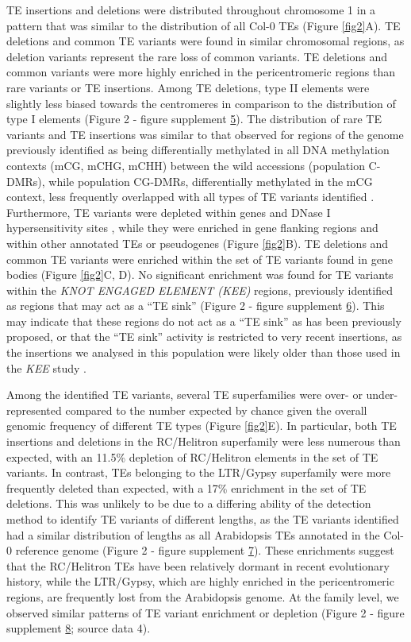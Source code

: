 \documentclass[12pt]{article}
\begin{document}
TE insertions and deletions were distributed throughout chromosome 1
in a pattern that was similar to the distribution of all Col-0 TEs
(Figure \ref{fig2}A). TE deletions and common TE variants were found
in similar chromosomal regions, as deletion variants represent the
rare loss of common variants.  TE deletions and common variants were
more highly enriched in the pericentromeric regions than rare variants
or TE insertions.  Among TE deletions, type II elements were slightly
less biased towards the centromeres in comparison to the distribution
of type I elements (Figure 2 - figure supplement
\hyperref[fig2s5]{5}).  The distribution of rare TE variants and TE
insertions was similar to that observed for regions of the genome
previously identified as being differentially methylated in all DNA
methylation contexts (mCG, mCHG, mCHH) between the wild accessions
(population C-DMRs), while population CG-DMRs, differentially
methylated in the mCG context, less frequently overlapped with all
types of TE variants identified \cite{Schmitz:2013iu}. Furthermore, TE
variants were depleted within genes and DNase I hypersensitivity sites
\cite{Sullivan:2014ii}, while they were enriched in gene flanking
regions and within other annotated TEs or pseudogenes (Figure
\ref{fig2}B). TE deletions and common TE variants were enriched within
the set of TE variants found in gene bodies (Figure \ref{fig2}C,
D). No significant enrichment was found for TE variants within the
\emph{KNOT ENGAGED ELEMENT (KEE) }regions, previously identified as
regions that may act as a ``TE sink'' \cite{Grob:2014kg} (Figure 2 -
figure supplement \hyperref[fig2s6]{6}). This may indicate that these
regions do not act as a ``TE sink'' as has been previously proposed,
or that the ``TE sink'' activity is restricted to very recent
insertions, as the insertions we analysed in this population were
likely older than those used in the \emph{KEE} study
\cite{Grob:2014kg}.

Among the identified TE variants, several TE superfamilies were over-
or under-represented compared to the number expected by chance given
the overall genomic frequency of different TE types (Figure
\ref{fig2}E). In particular, both TE insertions and deletions in the
RC/Helitron superfamily were less numerous than expected, with an
11.5\% depletion of RC/Helitron elements in the set of TE variants. In
contrast, TEs belonging to the LTR/Gypsy superfamily were more
frequently deleted than expected, with a 17\% enrichment in the set of
TE deletions. This was unlikely to be due to a differing ability of
the detection method to identify TE variants of different lengths, as
the TE variants identified had a similar distribution of lengths as
all Arabidopsis TEs annotated in the Col-0 reference genome (Figure 2
- figure supplement \hyperref[fig2s7]{7}). These enrichments suggest
that the RC/Helitron TEs have been relatively dormant in recent
evolutionary history, while the LTR/Gypsy, which are highly enriched
in the pericentromeric regions, are frequently lost from the
Arabidopsis genome. At the family level, we observed similar patterns
of TE variant enrichment or depletion (Figure 2 - figure supplement
\hyperref[fig2s8]{8}; source data 4).
\end{document}
